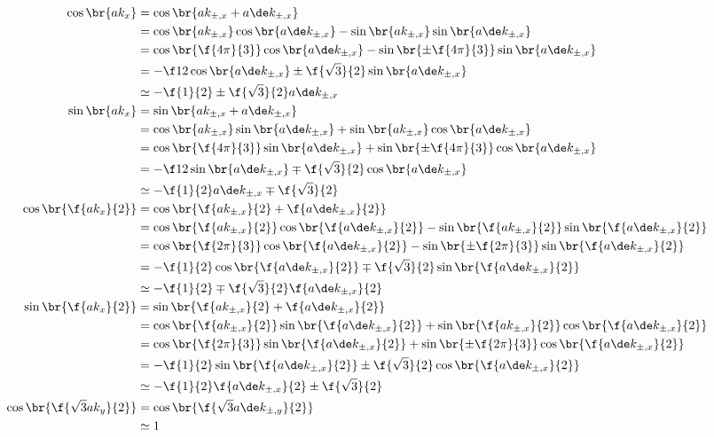 \documentclass{article}
\begin{document}
\begin{align*}
    \cos \br{ak_x} &= \cos \br{ak_{\pm,x} + a\de k_{\pm,x}} \\
    &= \cos \br{ak_{\pm,x}}\cos \br{a\de k_{\pm,x}} - \sin \br{ak_{\pm,x}}\sin \br{a\de k_{\pm,x}} \\
    &= \cos \br{\f{4\pi}{3}}\cos \br{a\de k_{\pm,x}} - \sin \br{\pm\f{4\pi}{3}}\sin \br{a\de k_{\pm,x}} \\
    &= -\f12\cos \br{a\de k_{\pm,x}} \pm \f{\sqrt{3}}{2}\sin \br{a\de k_{\pm,x}} \\
    &\simeq -\f{1}{2} \pm \f{\sqrt{3}}{2}a\de k_{\pm,x} \\
    \sin \br{ak_x} &= \sin \br{ak_{\pm,x} + a\de k_{\pm,x}} \\
    &= \cos \br{ak_{\pm,x}}\sin \br{a\de k_{\pm,x}} + \sin \br{ak_{\pm,x}}\cos \br{a\de k_{\pm,x}}\\
    &= \cos \br{\f{4\pi}{3}}\sin \br{a\de k_{\pm,x}} + \sin \br{\pm\f{4\pi}{3}}\cos \br{a\de k_{\pm,x}} \\
    &= -\f12\sin \br{a\de k_{\pm,x}} \mp \f{\sqrt{3}}{2}\cos \br{a\de k_{\pm,x}} \\
    &\simeq -\f{1}{2}a\de k_{\pm,x} \mp \f{\sqrt{3}}{2} \\
    \cos \br{\f{ak_x}{2}} &= \cos \br{\f{ak_{\pm,x}}{2} + \f{a\de k_{\pm,x}}{2}} \\
    &= \cos \br{\f{ak_{\pm,x}}{2}}\cos \br{\f{a\de k_{\pm,x}}{2}} - \sin \br{\f{ak_{\pm,x}}{2}}\sin \br{\f{a\de k_{\pm,x}}{2}} \\
    &= \cos \br{\f{2 \pi}{3}}\cos \br{\f{a\de k_{\pm,x}}{2}} - \sin \br{\pm\f{2 \pi}{3}}\sin \br{\f{a\de k_{\pm,x}}{2}} \\
    &= -\f{1}{2}\cos \br{\f{a\de k_{\pm,x}}{2}} \mp \f{\sqrt{3}}{2}\sin \br{\f{a\de k_{\pm,x}}{2}} \\
    &\simeq -\f{1}{2} \mp \f{\sqrt{3}}{2}\f{a\de k_{\pm,x}}{2} \\
    \sin \br{\f{ak_x}{2}} &= \sin \br{\f{ak_{\pm,x}}{2} + \f{a\de k_{\pm,x}}{2}} \\
    &= \cos \br{\f{ak_{\pm,x}}{2}}\sin \br{\f{a\de k_{\pm,x}}{2}} + \sin \br{\f{ak_{\pm,x}}{2}}\cos \br{\f{a\de k_{\pm,x}}{2}} \\
    &= \cos \br{\f{2 \pi}{3}}\sin \br{\f{a\de k_{\pm,x}}{2}} + \sin \br{\pm \f{2 \pi}{3}}\cos \br{\f{a\de k_{\pm,x}}{2}} \\
    &= -\f{1}{2}\sin \br{\f{a\de k_{\pm,x}}{2}} \pm \f{\sqrt{3}}{2}\cos \br{\f{a\de k_{\pm,x}}{2}} \\
    &\simeq -\f{1}{2}\f{a\de k_{\pm,x}}{2} \pm \f{\sqrt{3}}{2} \\
    \cos \br{\f{\sqrt{3}ak_y}{2}}
    &= \cos \br{\f{\sqrt{3}a\de k_{\pm,y}}{2}} \\
    &\simeq 1
\end{align*}
\end{document}
